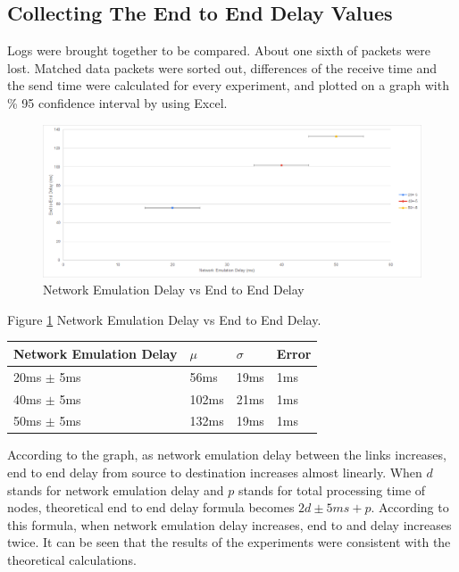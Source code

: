 \documentclass[conference]{IEEEtran}
\begin{document}
\subsection{Collecting The End to End Delay Values}

Logs were brought together to be compared. About one sixth of packets were lost. Matched data packets were sorted out, differences of the receive time and the send time were calculated for every experiment, and plotted on a graph with \% 95 confidence interval by using Excel.

\begin{figure}[h]
  \includegraphics[width=\linewidth]{plot_stat.png}
  \caption{Network Emulation Delay vs End to End Delay}
  \label{fig:plot}
\end{figure}

Figure \ref{fig:plot} Network Emulation Delay vs End to End Delay.

\begin{table}[h]
\centering
\begin{tabular}{|l|l|l|l|}
\hline
Network Emulation Delay & $\mu$ & $\sigma$ & Error \\ \hline
20ms $\pm$ 5ms              & 56ms  & 19ms     & 1ms     \\ \hline
40ms $\pm$ 5ms              & 102ms & 21ms     & 1ms     \\ \hline
50ms $\pm$ 5ms              & 132ms & 19ms     & 1ms     \\ \hline
\end{tabular}
\end{table}

According to the graph, as network emulation delay between the links increases, end to end delay from source to destination increases almost linearly. When $d$ stands for network emulation delay and $p$ stands for total processing time of nodes, theoretical end to end delay formula becomes $2d \pm 5ms + p$. According to this formula, when network emulation delay increases, end to and delay increases twice. It can be seen that the results of the experiments were consistent with the theoretical calculations.
\end{document}
